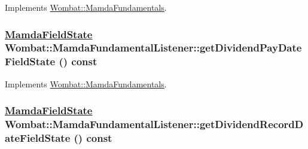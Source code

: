 Implements \hyperlink{classWombat_1_1MamdaFundamentals_f5f8ae5bbc476f93bc9223d1ae80ca0b}{Wombat::Mamda\-Fundamentals}.\hypertarget{classWombat_1_1MamdaFundamentalListener_5eecefe805188a8575e9fa0239145708}{
\subsubsection[getDividendPayDateFieldState]{\setlength{\rightskip}{0pt plus 5cm}\hyperlink{namespaceWombat_93aac974f2ab713554fd12a1fa3b7d2a}{Mamda\-Field\-State} Wombat::Mamda\-Fundamental\-Listener::get\-Dividend\-Pay\-Date\-Field\-State () const}}
\label{classWombat_1_1MamdaFundamentalListener_5eecefe805188a8575e9fa0239145708}




Implements \hyperlink{classWombat_1_1MamdaFundamentals_29de98f5c24812d90fb5efb76f0293e0}{Wombat::Mamda\-Fundamentals}.\hypertarget{classWombat_1_1MamdaFundamentalListener_baaedf6fb1b2eae95df6617d0b893224}{
\subsubsection[getDividendRecordDateFieldState]{\setlength{\rightskip}{0pt plus 5cm}\hyperlink{namespaceWombat_93aac974f2ab713554fd12a1fa3b7d2a}{Mamda\-Field\-State} Wombat::Mamda\-Fundamental\-Listener::get\-Dividend\-Record\-Date\-Field\-State () const}}
\label{classWombat_1_1MamdaFundamentalListener_baaedf6fb1b2eae95df6617d0b893224}




